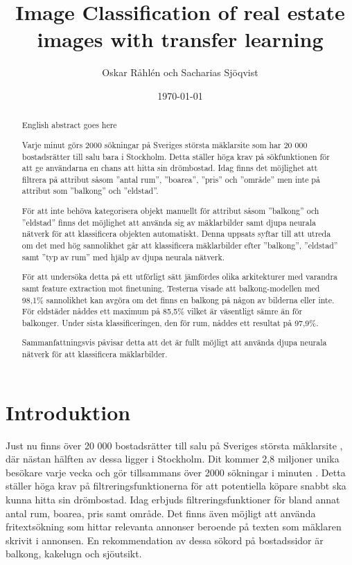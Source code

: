 \documentclass[]{kththesis}
\title{Image Classification of real estate images with transfer learning}
\author{Oskar Råhlén och Sacharias Sjöqvist}
\date{\today}
\begin{document}
\frontmatter
\titlepage

\begin{abstract}
    English abstract goes here
\end{abstract}

\begin{otherlanguage}{swedish}
  \begin{abstract}
    Varje minut görs 2000 sökningar på Sveriges största mäklarsite som har 20 000 bostadsrätter till salu bara i Stockholm.
    Detta ställer höga krav på sökfunktionen för att ge användarna en chans att hitta sin drömbostad. 
    Idag finns det möjlighet att filtrera på attribut såsom ”antal rum”, ”boarea”, ”pris” och ”område” men inte på attribut som ”balkong” och ”eldstad”.

    För att inte behöva kategorisera objekt manuellt för attribut såsom ”balkong” och ”eldstad” finns det möjlighet att använda sig av mäklarbilder samt djupa neurala nätverk för att klassificera objekten automatiskt.
    Denna uppsats syftar till att utreda om det med hög sannolikhet går att klassificera mäklarbilder efter ”balkong”, ”eldstad” samt ”typ av rum” med hjälp av djupa neurala nätverk.
    
    För att undersöka detta på ett utförligt sätt jämfördes olika arkitekturer med varandra samt feature extraction mot finetuning.
    Testerna visade att balkong-modellen med 98,1\% sannolikhet kan avgöra om det finns en balkong på någon av bilderna eller inte.
    För eldstäder nåddes ett maximum på 85,5\% vilket är väsentligt sämre än för balkonger.
    Under sista klassificeringen, den för rum, nåddes ett resultat på 97,9\%.

    Sammanfattningsvis påvisar detta att det är fullt möjligt att använda djupa neurala nätverk för att klassificera mäklarbilder. 
    

  \end{abstract}
\end{otherlanguage}
  
\tableofcontents

\mainmatter

\chapter{Introduktion}
Just nu finns över 20 000 bostadsrätter \parencite{hemnetstats} till salu på Sveriges största mäklarsite \parencite{hemnetom}, där nästan hälften av dessa ligger i Stockholm. Dit kommer 2,8 miljoner unika besökare varje vecka och gör tillsammans över 2000 sökningar i minuten \parencite{hemnetom}. Detta ställer höga krav på filtreringsfunktionerna för att potentiella köpare snabbt ska kunna hitta sin drömbostad. Idag erbjuds filtreringsfunktioner för bland annat antal rum, boarea, pris samt område. Det finns även möjligt att använda fritextsökning som hittar relevanta annonser beroende på texten som mäklaren skrivit i annonsen. En rekommendation av dessa sökord på bostadssidor är balkong, kakelugn och sjöutsikt.
\end{document}
